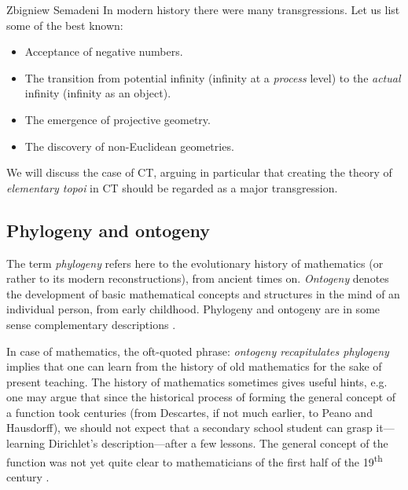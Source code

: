 \begin{artengenv}{Zbigniew Semadeni}
\noindent In modern history there were many transgressions. Let us list some of 
the best known: 

\begin{itemize}
\item Acceptance of negative numbers.
\item The transition from potential infinity (infinity at a \textit{process} 
level) to the \textit{actual} infinity (infinity as an object). 
\item The emergence of projective geometry.  
\item The discovery of non-Euclidean geometries. 
\end{itemize}

\noindent We will discuss the case of CT, arguing in particular that creating the 
theory of \textit{elementary topoi} in CT should be regarded as a major transgression. 

\subsection{Phylogeny and ontogeny}
The term \textit{phylogeny} refers here to the evolutionary history of mathematics 
(or rather to its modern reconstructions), from ancient times on. 
\textit{Ontogeny} denotes the development of basic mathematical concepts and 
structures in the mind of an individual person, from early childhood. Phylogeny and 
ontogeny are in some sense complementary descriptions \parencites[][]{HF}[][pp.4-29]{P-G}.

In case of mathematics, the oft-quoted phrase: \textit{ontogeny recapitulates 
phylogeny} implies that one can learn from the history of old mathematics for the 
sake of present teaching. The history of
mathematics sometimes gives useful hints, e.g. one may argue that 
since the historical process of forming the general concept of a function took 
centuries (from Descartes, if not much earlier, to Peano and Hausdorff), we should 
not expect that a secondary school student can grasp it---learning Dirichlet’s 
description---after a few lessons. The general concept of the function was not 
yet quite clear to mathematicians of the first half of the 19\textsuperscript{th} century 
\parencites[][Appendix 2]{Lakatos}{Youschkevitsch}[][pp.27--30]{Ferreiros}. 


\end{artengenv}
